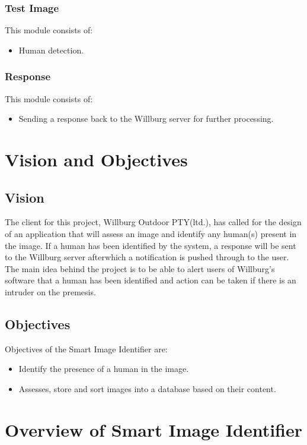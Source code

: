 \documentclass[a4paper,12pt]{report}
\begin{document}
	\subsubsection {Test Image}
		This module consists of:
			\begin {itemize}
				\item Human detection.
			\end {itemize}

	\subsubsection {Response}
		This module consists of:
			\begin {itemize}
				\item Sending a response back to the Willburg server for further processing.
			\end {itemize}


\section {Vision and Objectives}
	\subsection {Vision}
	 The client for this project, Willburg Outdoor PTY(ltd.), has called for the design of an application that will assess an image and identify any human(s) present in the image. If a human has been identified by the system, a response will be sent to the Willburg server afterwhich a notification is pushed through to the user. The main idea behind the project is to be able to alert users of Willburg's software that a human has been identified and action can be taken if there is an intruder on the premesis.

	\subsection {Objectives}
	Objectives of the Smart Image Identifier are:
	\begin {itemize}
		\item Identify the presence of a human in the image.
		\item Assesses, store and sort images into a database based on their content.
	\end {itemize}

\newpage
\section {Overview of Smart Image Identifier}
	\FloatBarrier
\end{document}
